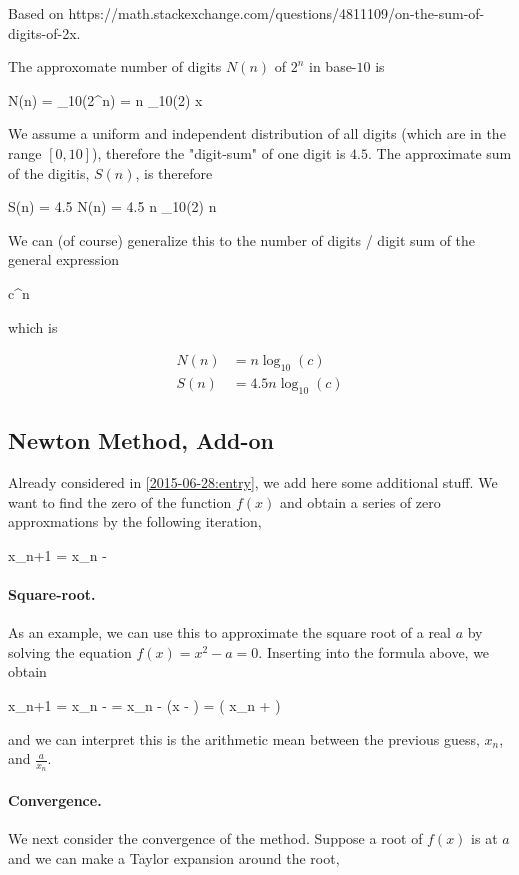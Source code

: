 Based on https://math.stackexchange.com/questions/4811109/on-the-sum-of-digits-of-2x.

The approxomate number of digits $N(n)$ of $2^n$ in base-$10$ is

\bee
N(n) = \log_{10}(2^n) = n \log_{10}(2)  x
\eee

We assume a uniform and independent distribution of all digits (which are in the range $[0,10]$), therefore the "digit-sum" of one digit is $4.5$. The approximate sum of the digitis, $S(n)$, is therefore

\bee
S(n) = 4.5 N(n) = 4.5 n \log_{10}(2)  n
\eee

We can (of course) generalize this to the number of digits / digit sum of the general expression

\bee
c^n
\eee

which is

\begin{align*}
N(n) &= n \log_{10}(c) \\
S(n) &= 4.5 n \log_{10}(c)
\end{align*}



\subsection{Newton Method, Add-on}

Already considered in \ref{2015-06-28:entry}, we add here some additional stuff. We want to find the zero of the function $f(x)$ and obtain a series of zero approxmations by the following iteration,

\be\label{newton:eq1}
x_{n+1} = x_n - 
\ee

\paragraph{Square-root.} As an example, we can use this to approximate the square root of a real $a$ by solving the equation $f(x) = x^2 - a = 0$. Inserting into the formula above, we obtain

\bee
x_{n+1} = x_n -  = x_n - \left(x - \frac{a}{x]}\right) =  \left( x_n + \right)
\eee

and we can interpret this is the arithmetic mean between the previous guess, $x_n$, and $\frac{a}{x_n}$.

\paragraph{Convergence.} We next consider the convergence of the method. Suppose a root of $f(x)$ is at $a$ and we can make a Taylor expansion around the root,

